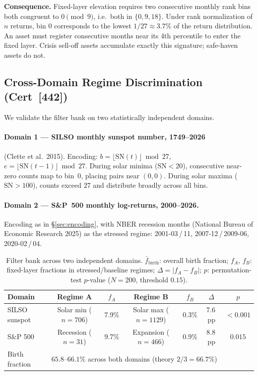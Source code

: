 \noindent
\textbf{Consequence.}
Fixed-layer elevation requires two consecutive monthly rank bins both
congruent to $0 \pmod{9}$, i.e.\ both in $\{0, 9, 18\}$.  Under
rank normalization of $n$ returns, bin $0$ corresponds to the lowest
$1/27 \approx 3.7\%$ of the return distribution.  An asset must register
consecutive months near its $4$th percentile to enter the fixed layer.
Crisis sell-off assets accumulate exactly this signature; safe-haven assets
do not.

\subsection{Cross-Domain Regime Discrimination (Cert~[442])}
\label{sec:cert442}

We validate the filter bank on two statistically independent domains.

\paragraph{Domain 1 — SILSO monthly sunspot number, 1749--2026}
(Clette et al.\ 2015).
Encoding: $b = \lfloor\mathrm{SN}(t)\rfloor \bmod 27$,
$e = \lfloor\mathrm{SN}(t{-}1)\rfloor \bmod 27$.
During solar minima ($\mathrm{SN} < 20$), consecutive near-zero counts
map to bin~$0$, placing pairs near $(0,0)$.  During solar maxima
($\mathrm{SN} > 100$), counts exceed $27$ and distribute broadly
across all bins.

\paragraph{Domain 2 — S\&P~500 monthly log-returns, 2000--2026.}
Encoding as in \S\ref{sec:encoding}, with NBER recession months
(National Bureau of Economic Research 2025) as the stressed regime:
2001-03\,/\,11, 2007-12\,/\,2009-06, 2020-02\,/\,04.

\begin{table}[h]
\centering
\caption{Filter bank across two independent domains.
  $\bar{f}_\mathrm{birth}$: overall birth fraction;
  $f_A$, $f_B$: fixed-layer fractions in stressed/baseline regimes;
  $\Delta = |f_A - f_B|$;
  $p$: permutation-test $p$-value ($N=200$, threshold $0.15$).}
\label{tab:cert442}
\begin{tabular}{lcccccc}
\toprule
Domain & Regime A & $f_A$ & Regime B & $f_B$ & $\Delta$ & $p$ \\
\midrule
SILSO sunspot     & Solar min ($n=706$) & 7.9\% & Solar max ($n=1129$) & 0.3\% & 7.6\,pp & $<0.001$ \\
S\&P 500          & Recession ($n=31$)  & 9.7\% & Expansion ($n=466$)  & 0.9\% & 8.8\,pp & $0.015$  \\
\midrule
Birth fraction & \multicolumn{5}{l}{$65.8$--$66.1\%$ across both domains \quad (theory $2/3 = 66.7\%$)} \\
\bottomrule
\end{tabular}
\end{table}

